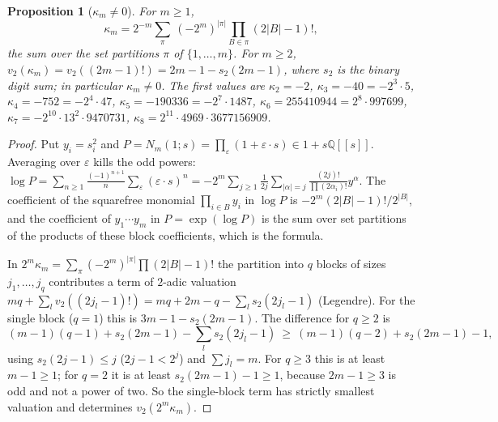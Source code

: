\documentclass[11pt]{article}
\newcommand{\Q}{\mathbb Q}
\newtheorem{proposition}[theorem]{Proposition}
\theoremstyle{definition}
\theoremstyle{remark}
\begin{document}
\begin{proposition}[$\kappa_m\ne0$]\label{prop:kappa}
For $m\ge1$,
\[
 \kappa_m=2^{-m}\sum_{\pi}\ (-2^m)^{|\pi|}\prod_{B\in\pi}(2|B|-1)! ,
\]
the sum over the set partitions $\pi$ of $\{1,\ldots,m\}$. For $m\ge2$,
$v_2(\kappa_m)=v_2((2m-1)!)=2m-1-s_2(2m-1)$, where $s_2$ is the binary
digit sum; in particular $\kappa_m\ne0$.
The first values are $\kappa_2=-2$, $\kappa_3=-40=-2^3\cdot5$,
$\kappa_4=-752=-2^4\cdot47$, $\kappa_5=-190336=-2^7\cdot1487$,
$\kappa_6=255410944=2^8\cdot997699$, $\kappa_7=-2^{10}\cdot13^2\cdot9470731$,
$\kappa_8=2^{11}\cdot4969\cdot3677156909$.
\end{proposition}
\begin{proof}
Put $y_i=s_i^2$ and $P=N_m(1;s)=\prod_\varepsilon(1+\varepsilon\cdot s)\in1+s\Q[[s]]$.
Averaging over $\varepsilon$ kills the odd powers:
$\log P=\sum_{n\ge1}\frac{(-1)^{n+1}}n\sum_\varepsilon(\varepsilon\cdot s)^n
=-2^m\sum_{j\ge1}\frac1{2j}\sum_{|\alpha|=j}\frac{(2j)!}{\prod(2\alpha_i)!}y^\alpha$.
The coefficient of the squarefree monomial $\prod_{i\in B}y_i$ in $\log P$ is
$-2^m(2|B|-1)!/2^{|B|}$, and the coefficient of $y_1\cdots y_m$ in
$P=\exp(\log P)$ is the sum over set partitions of the products of these block
coefficients, which is the formula.

In $2^m\kappa_m=\sum_\pi(-2^m)^{|\pi|}\prod(2|B|-1)!$ the partition into $q$
blocks of sizes $j_1,\ldots,j_q$ contributes a term of $2$-adic valuation
$mq+\sum_l v_2((2j_l-1)!)=mq+2m-q-\sum_ls_2(2j_l-1)$ (Legendre). For the
single block ($q=1$) this is $3m-1-s_2(2m-1)$. The difference for $q\ge2$ is
\[
 (m-1)(q-1)+s_2(2m-1)-\sum_l s_2(2j_l-1)\ \ge\ (m-1)(q-2)+s_2(2m-1)-1 ,
\]
using $s_2(2j-1)\le j$ ($2j-1<2^j$) and $\sum j_l=m$. For $q\ge3$ this is at
least $m-1\ge1$; for $q=2$ it is at least $s_2(2m-1)-1\ge1$, because $2m-1\ge3$
is odd and not a power of two. So the single-block term has strictly
smallest valuation and determines $v_2(2^m\kappa_m)$.
\end{proof}
\end{document}
